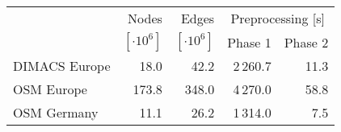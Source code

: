 \begin{tabular}{lrrrr}
\toprule
 & Nodes          & Edges          & \multicolumn{2}{c}{Preprocessing [s]} \\ \cmidrule(lr){4-5} & $[\cdot 10^6]$ & $[\cdot 10^6]$ & Phase 1 & Phase 2 \\
\midrule
DIMACS Europe &       18.0 &       42.2 &        2\,260.7 &          11.3 \\
OSM Europe    &      173.8 &      348.0 &        4\,270.0 &          58.8 \\
OSM Germany   &       11.1 &       26.2 &        1\,314.0 &           7.5 \\
\bottomrule
\end{tabular}

